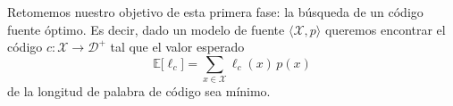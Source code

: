 \documentclass[11pt]{article}
\newcommand{\scD}{\mathcal{D}}
\newcommand{\scX}{\mathcal{X}}
\newcommand{\field}[1]{\mathbb{#1}}
\newcommand{\E}{\field{E}}
\begin{document}
\begin{center}
\end{center}

\bigskip

Retomemos nuestro objetivo de esta primera fase: la búsqueda de un código fuente óptimo. Es decir, dado un modelo de fuente $\langle\scX,p\rangle$ queremos encontrar el código $c : \scX\to\scD^+$ tal que el valor esperado
\begin{equation}
\label{eq:obj}
    \E\bigl[\ell_c\bigr] = \sum_{x\in\scX} \ell_c(x)\,p(x)
\end{equation}
de la longitud de palabra de código sea mínimo.
\end{document}

